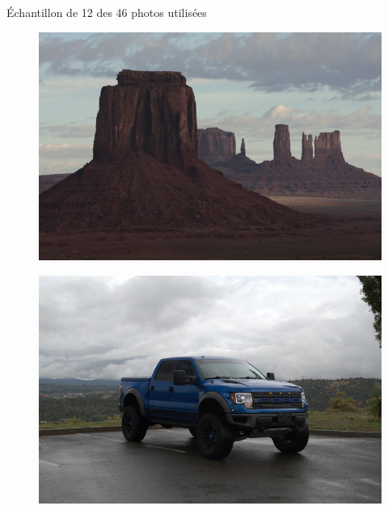 \documentclass[xcolor=dvipsnames]{beamer}
\begin{document}
\begin{frame}{Échantillon de 12 des 46 photos utilisées}
\begin{minipage}{.23\textwidth}
\begin{figure}
        \end{figure}
        \begin{figure}
            \includegraphics[width=1\linewidth]{photos_utilises/6.jpg}
        \end{figure}
        \begin{figure}
            \includegraphics[width=1\linewidth]{photos_utilises/12.jpg}
        \end{figure}
    \end{minipage}
    \hfill
    \begin{minipage}{.23\textwidth}
        \centering
        \begin{figure}

\end{figure}
\end{minipage}
\end{frame}
\end{document}
